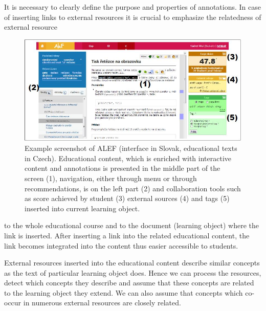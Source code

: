 \documentclass[a4, conference]{IEEEtran}
\begin{document}
It is necessary to clearly define the purpose and properties of annotations. In case of inserting links to external resources it is crucial to emphasize the relatedness of external resource
\begin{figure}%
\centering
\includegraphics [width=\textwidth]{Figure1.jpg}
\caption{Example screenshot of ALEF (interface in Slovak, educational texts in Czech). Educational content, which is enriched with interactive content and annotations is presented in the middle part of the screen (1), navigation, either through menu or through recommendations, is on the left part (2) and collaboration tools such as score achieved by student (3) external sources (4) and tags (5) inserted into current learning object.}
\label{obrazok1}
\end{figure}
to the whole educational course and to the document (learning object) where the link is inserted. After inserting a link into the related educational content, the link becomes integrated into the content thus easier accessible to students.

External resources inserted into the educational content describe similar concepts as the text of particular learning object does. Hence we can process the resources, detect which concepts they describe and assume that these concepts are related to the learning object they extend. We can also assume that concepts which co-occur in numerous external resources are closely related.
\end{document}

